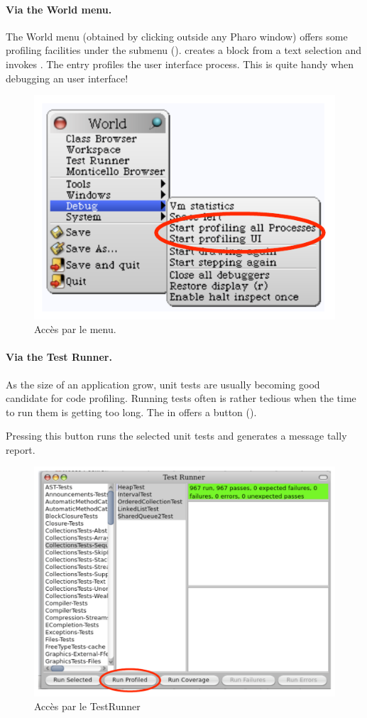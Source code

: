 \documentclass[a4paper,10pt,twoside]{book}
\begin{document}
\paragraph{Via the World menu.}
The World menu (obtained by clicking outside any Pharo window) offers some profiling facilities under the  submenu ().  creates a block from a text selection and invokes . The entry  profiles the user interface process. This is quite handy when debugging an user interface!

\begin{figure}[h]
	\begin{center}
	\includegraphics[width=.6\linewidth]{menu}
	\caption{Acc\`es par le menu.}
	\end{center}
\end{figure}



\paragraph{Via the Test Runner.}
As the size of an application grow, unit tests are usually becoming good candidate for code profiling. Running tests often is rather tedious when the time to run them is getting too long. The  in \pharo offers a button  (). 

Pressing this button runs the selected unit tests and generates a message tally report. 

\begin{figure}[h]
	\begin{center}
	\includegraphics[width=.8\linewidth]{testRunner}
	\caption{Acc\`es par le TestRunner}
	\end{center}
\end{figure}
\end{document}
